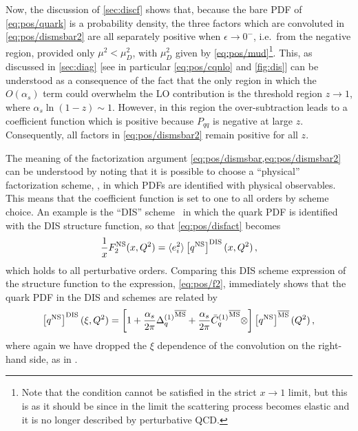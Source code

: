 Now, the discussion of \cref{sec:discf} shows that, because the
bare PDF of \cref{eq:pos/quark} is a probability density, the three
factors which are convoluted in \cref{eq:pos/dismsbar2} are all
separately positive when $\epsilon \to 0^-$, i.e.\ from the negative
region, provided only $\mu^2< \mu_D^2$, with $\mu_D^2$ given by
\cref{eq:pos/mud}\footnote{Note that the condition cannot be satisfied in
the strict $x\to1$ limit, but this is as it should be since in the
limit the scattering process becomes elastic and it is no longer
described by perturbative QCD.}.
This, as discussed in \cref{sec:diag} [see in particular \cref{eq:pos/cqnlo}
and \cref{fig:dis}] can be understood as a consequence of the fact that the
only region in which the $O(\alpha_s)$ term could overwhelm the LO contribution
is the threshold region $z\to 1$, where $\alpha_s\ln(1-z)\sim1$.
However, in this region the \msbar{} over-subtraction leads to a
coefficient function which is positive because $P_{qq}$ is negative at
large $z$.
Consequently, all factors in \cref{eq:pos/dismsbar2} remain positive for all
$z$.

The  meaning of the factorization argument
\cref{eq:pos/dismsbar,eq:pos/dismsbar2} can be understood by noting that it is
possible to choose a \enquote{physical} factorization scheme,
\cite{Catani:1995ze}, in which PDFs are identified with physical observables.
This means that the coefficient function is set to one to all orders by scheme
choice.
An example is the ``DIS'' scheme~\cite{Diemoz:1987xu} in which the quark PDF is
identified with the DIS structure function, so that \cref{eq:pos/disfact}
becomes
\begin{equation}\label{eq:pos/disfactns}
 \frac{1}{x} F_2^{{\textrm{NS}}}(x,Q^2)= \langle e_i^2\rangle  \left[{q^{{\textrm{NS}}}}\right]^{\textrm{DIS}}(x,Q^2) \,,
 \end{equation}
which holds to all perturbative orders. Comparing this DIS scheme
expression of the structure function to the \msbar{} expression,
\cref{eq:pos/f2}, immediately shows that the quark PDF in the DIS
and \msbar{} schemes are related by
\begin{equation}\label{eq:pos/msbartodis}
\left[{q^{{\textrm{NS}}}}\right]^{\textrm{DIS}}(\xi,Q^2)=
\left[1+\frac{\alpha_s}{2\pi} {\Delta^{(1)}_q}^{{\overline{\textrm{MS}}}}
  +\frac{\alpha_s}{2\pi}
  {{{\bar{C}}^{(1)}}_q{}}^{{\overline{\textrm{MS}}}}\otimes\right]\left[{q^{{\textrm{NS}}}}\right]^{{\overline{\textrm{MS}}}}(Q^2) \,,
\end{equation}
where again we have dropped the $\xi$ dependence of the convolution
on the right-hand side,
as in .

